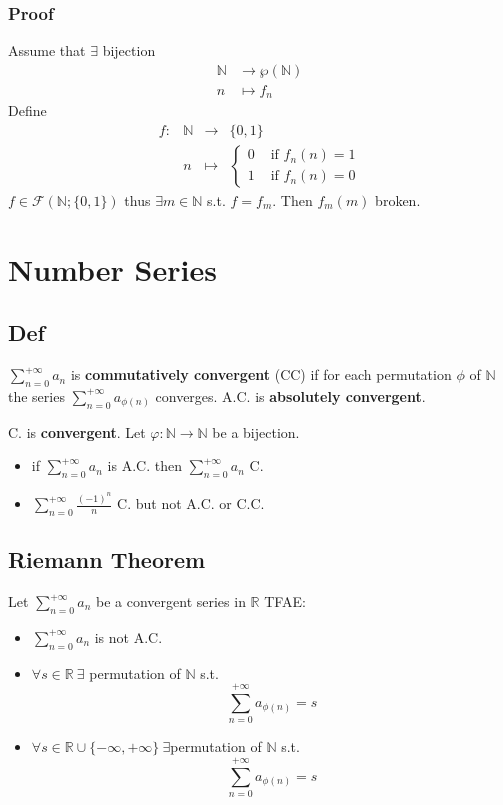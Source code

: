 \documentclass{book}
\begin{document}
\subsection*{Proof}
Assume that $\exists$ bijection
$$\begin{align}
    \mathbb N &\rightarrow \wp(\mathbb N)\\ n&\mapsto f_n
\end{align}$$
Define $$\begin{aligned}
    f:&\mathbb N &\rightarrow &\{0,1\}\\ &n&\mapsto &\left\{\begin{aligned}
        0 &\text{ if }f_n(n)=1\\ 1&\text{ if }f_n(n)=0
    \end{aligned}\right.
\end{aligned}$$
$f\in \mathcal F(\mathbb N;\{0,1\})$ thus $\exists m\in \mathbb N$ s.t. $f=f_m$. Then $f_m(m)$ broken.
\chapter{Number Series}
\section{Def}
$\sum\limits_{n=0}^{+\infty}a_n$ is \textbf{commutatively convergent} (CC) if for each permutation $\phi$ of $\mathbb N$ the series $\sum\limits_{n=0}^{+\infty}a_{\phi(n)}$ converges. 
A.C. is \textbf{absolutely convergent}.

C. is \textbf{convergent}.
Let $\varphi:\mathbb N\rightarrow \mathbb N$ be a bijection.
\begin{itemize}
    \item if $\sum\limits_{n=0}^{+\infty}a_n$ is A.C. then $\sum\limits_{n=0}^{+\infty}a_n$ C.
    \item $\sum\limits_{n=0}^{+\infty}\frac{(-1)^n}n$ C. but not A.C. or C.C.
\end{itemize}
\section{Riemann Theorem}
Let $\sum\limits_{n=0}^{+\infty}a_n$ be a convergent series in $\mathbb R$ TFAE:
\begin{itemize}
    \item $\sum\limits_{n=0}^{+\infty}a_n$ is not A.C.
    \item $\forall s\in \mathbb R\ \exists$ permutation of $\mathbb N$ s.t.$$\sum\limits_{n=0}^{+\infty}a_{\phi(n)}=s$$
    \item $\forall s\in \mathbb R\cup\{-\infty,+\infty\}\ \exists$permutation of $\mathbb N$ s.t.$$\sum\limits_{n=0}^{+\infty}a_{\phi(n)}=s$$ 
\end{itemize}
\end{document}
